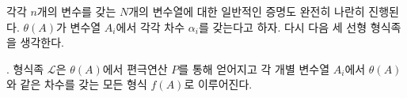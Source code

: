 
각각 $n$개의 변수를 갖는 $N$개의 변수열에 대한 일반적인 증명도 완전히 나란히 진행된다. $\theta(A)$가 변수열 $A_i$에서 각각 차수 $\alpha_i$를 갖는다고 하자. 다시 다음 세 선형 형식족을 생각한다.

. 형식족 $\mathcal L$은 $\theta(A)$에서 편극연산 $P$를 통해 얻어지고 각 개별 변수열 $A_i$에서 $\theta(A)$와 같은 차수를 갖는 모든 형식 $f(A)$로 이루어진다.
